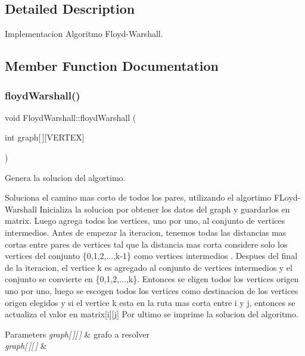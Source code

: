 \subsection{Detailed Description}
Implementacion Algoritmo Floyd-\/\+Warshall. 

\subsection{Member Function Documentation}
\mbox{\label{classFloydWarshall_a75a05e1f9ae7d6edc9c7efeffe19ac74}} 
\subsubsection{\texorpdfstring{floyd\+Warshall()}{floydWarshall()}}
{\footnotesize\ttfamily void Floyd\+Warshall\+::floyd\+Warshall (\begin{DoxyParamCaption}\item[{int}]{graph\mbox{[}$\,$\mbox{]}\mbox{[}\+V\+E\+R\+T\+E\+X\mbox{]} }\end{DoxyParamCaption})}



Genera la solucion del algortimo. 

Soluciona el camino mas corto de todos los pares, utilizando el algortimo F\+Loyd-\/\+Warshall Inicializa la solucion por obtener los datos del graph y guardarlos en matrix. Luego agrega todos los vertices, uno por uno, al conjunto de vertices intermedios. Antes de empezar la iteracion, tenemos todas las distancias mas cortas entre pares de vertices tal que la distancia mas corta considere solo los vertices del conjunto \{0,1,2,...,k-\/1\} como vertices intermedios . Despues del final de la iteracion, el vertice k es agregado al conjunto de vertices intermedios y el conjunto se convierte en \{0,1,2,...,k\}. Entonces se eligen todos los vertices origen uno por uno, luego se escogen todos los vertices como destinacion de los vertices origen elegidos y si el vertice k esta en la ruta mas corta entre i y j, entonces se actualiza el valor en matrix\mbox{[}i\mbox{]}\mbox{[}j\mbox{]} Por ultimo se imprime la solucion del algoritmo.


\begin{DoxyParams}{Parameters}
{\em graph\mbox{[}$\,$\mbox{]}\mbox{[}$\,$\mbox{]}} & grafo a resolver\\
\hline
{\em graph\mbox{[}$\,$\mbox{]}\mbox{[}$\,$\mbox{]}} & \\
\hline
\end{DoxyParams}
\mbox{\label{classFloydWarshall_aef3b3e3377992e6c4e7af01a64e710d7}} 
